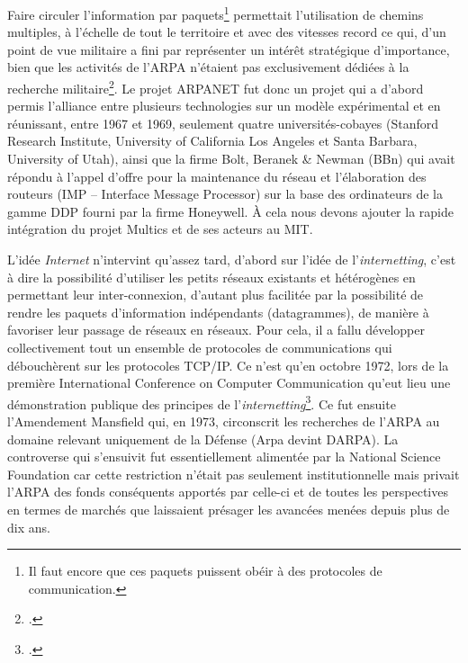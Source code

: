 \documentclass{FramateX}
\begin{document}
\begin{refsection}
Faire circuler l'information par paquets\footnote{Il
faut encore que ces paquets puissent obéir à des protocoles de
communication.} permettait l'utilisation de chemins
multiples, à l'échelle de tout le territoire et avec
des vitesses record ce qui, d'un point de vue
militaire a fini par représenter un intérêt stratégique
d'importance, bien que les activités de
l'ARPA n'étaient pas exclusivement
dédiées à la recherche militaire\footnote{\cite{Roland2002}.}. Le projet ARPANET fut donc un projet qui a
d'abord permis l'alliance entre
plusieurs technologies sur un modèle expérimental et en réunissant,
entre 1967 et 1969, seulement quatre universités-cobayes (Stanford
Research Institute, University of California Los Angeles et Santa
Barbara, University of Utah), ainsi que la firme Bolt, Beranek \& Newman (BBn) qui avait répondu à
l'appel d'offre pour la maintenance
du réseau et l'élaboration des routeurs (IMP --
Interface Message Processor) sur la base des ordinateurs de la gamme
DDP fourni par la firme Honeywell. À cela nous devons ajouter la rapide
intégration du projet Multics et de ses acteurs au MIT.

L'idée \textit{Internet} n'intervint
qu'assez tard, d'abord sur
l'idée de l'\textit{internetting},
c'est à dire la possibilité
d'utiliser les petits réseaux existants et hétérogènes
en permettant leur inter-connexion, d'autant plus
facilitée par la possibilité de rendre les paquets
d'information indépendants (datagrammes), de manière à
favoriser leur passage de réseaux en réseaux. Pour cela, il a fallu
développer collectivement tout un ensemble de protocoles de
communications qui débouchèrent sur les protocoles TCP/IP. Ce
n'est qu'en octobre 1972, lors de la
première International Conference on Computer Communication
qu'eut lieu une démonstration publique des principes
de l'\textit{internetting}\footnote{\cite{cerfcomputer1995}.}. Ce
fut ensuite l'Amendement Mansfield qui, en 1973,
circonscrit les recherches de l'ARPA au domaine
relevant uniquement de la Défense (Arpa devint DARPA). La controverse
qui s'ensuivit fut essentiellement alimentée par la
National Science Foundation car cette restriction
n'était pas seulement institutionnelle mais privait
l'ARPA des fonds conséquents apportés par celle-ci et
de toutes les perspectives en termes de marchés que laissaient présager
les avancées menées depuis plus de dix ans.


\end{refsection}
\end{document}

